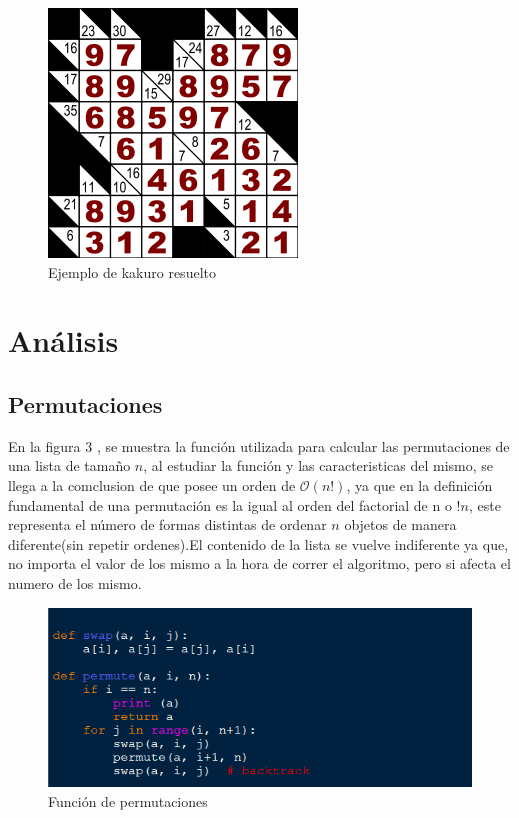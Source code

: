 \documentclass[journal]{IEEEtran}
\begin{document}
\begin{figure}[h] 
        \centering \includegraphics[width=.35\columnwidth]{kakuro_solved.png}
        \caption{
                \label{fig:samplesetup}
                Ejemplo de kakuro resuelto
        }
\end{figure}

\section{Análisis}

\subsection{Permutaciones}
En la figura 3
, se muestra la funci\'{o}n utilizada para calcular las permutaciones de una lista de tama\~{n}o $n$,  al estudiar la funci\'{o}n y las caracteristicas del mismo, se llega a la comclusion de que posee un orden de $\mathcal{O}(n!)$, ya que en la definici\'{o}n fundamental de una permutaci\'{o}n es la igual al orden del factorial de n o $!n$, este representa el número de formas distintas de ordenar $n$ objetos de manera diferente(sin repetir ordenes).El contenido de la lista se vuelve indiferente ya que, no importa el valor de los mismo a la hora de correr el algoritmo, pero si afecta el numero de los mismo.

\begin{figure}[hb] 
	\centering \includegraphics[width=0.9\columnwidth]{permutacion.png}
	\caption{
		\label{fig:samplesetup}
		Función de permutaciones 
	}
\end{figure} 
\end{document}
